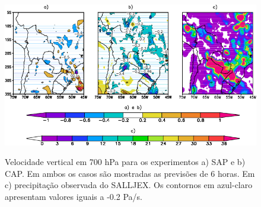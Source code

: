 \begin{figure}[!hbp]

\includegraphics[height=7cm]{./figs/omega.png}
\caption{Velocidade vertical em 700 hPa para os experimentos a) SAP e b) CAP. Em ambos os casos são mostradas as previsões de 6 horas. Em c) precipitação observada do SALLJEX. Os contornos em azul-claro apresentam valores iguais a -0.2 Pa/s.}
\label{fig20}
\end{figure}
